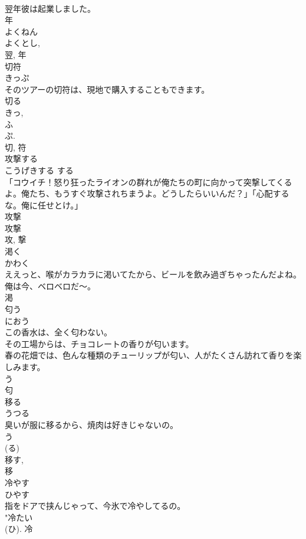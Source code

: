 \documentclass[8pt]{extreport}
\begin{document}
\begin{CJK}{UTF8}{min}
\\	翌年彼は起業しました。	
\\	年 
\\	よくねん 
\\	よくとし, 
\\	翌, 年	
\\	切符	
\\	きっぷ	
\\	そのツアーの切符は、現地で購入することもできます。	
\\	切る 
\\	きっ, 
\\	ふ 
\\	ぷ. 
\\	切, 符	
\\	攻撃する	
\\	こうげきする	する 
\\	「コウイチ！怒り狂ったライオンの群れが俺たちの町に向かって突撃してくるよ。俺たち、もうすぐ攻撃されちまうよ。どうしたらいいんだ？」「心配するな。俺に任せとけ。」	
\\	攻撃 
\\	攻撃 
\\	攻, 撃	
\\	渇く	
\\	かわく	
\\	ええっと、喉がカラカラに渇いてたから、ビールを飲み過ぎちゃったんだよね。俺は今、ベロベロだ〜。	
\\	渇	
\\	匂う	
\\	におう	
\\	この香水は、全く匂わない。	
\\	その工場からは、チョコレートの香りが匂います。	
\\	春の花畑では、色んな種類のチューリップが匂い、人がたくさん訪れて香りを楽しみます。	
\\	う 
\\	匂	
\\	移る	
\\	うつる	
\\	臭いが服に移るから、焼肉は好きじゃないの。	
\\	う 
\\	(る) 
\\	移す, 
\\	移	
\\	冷やす	
\\	ひやす	
\\	指をドアで挟んじゃって、今氷で冷やしてるの。	
\\	"冷たい 
\\	(ひ).	冷	

\end{CJK}
\end{document}
